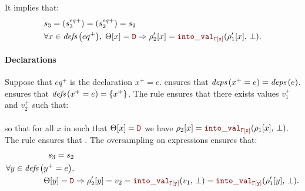 \begin{skippableproof}
    It implies that:
    \begin{align*}
         & s_3 = (s_3^{eq+}) = (s_2^{eq+}) = s_2                                                                            \\
         & \forall x \in \defs{eq^+}, \; \Theta[x] = \dType \Rightarrow \rho'_2[x] = \intoVal{\tyCtx[x]}{\rho'_1[x]}{\bot}.
    \end{align*}

    \paragraph{Declarations}
    Suppose that $eq^+$ is the declaration $x^+ = e$.
     ensures that
    ${\textit{deps}\left(x^+ = e\right)} = {\textit{deps}\left(e\right)}$.
     ensures that
    ${\textit{defs}\left(x^+ = e\right)} = \{x^+\}$.
    The rule  ensures that there exists
    values $v_1^+$ and $v_2^+$ such that:
    \\\noindent{}\\\noindent
    so that for all $x$ in  such that $\Theta[x] = \dType$ we have $\rho_2[x] =
        \intoVal{\tyCtx[x]}{\rho_1[x]}{\bot}$.
    The rule  ensures that
    .
    The oversampling  on expressions
    ensures that:
    \begin{align*}
        s_3 = s_2                     &                          \\
        \forall y \in \defs{y^+ = e}, &                          \\
        \Theta[y] = \dType            & \Rightarrow \rho'_2[y] =
        v_2 = \intoVal{\tyCtx[y]}{v_1}{\bot} = \intoVal{\tyCtx[y]}{\rho'_1[y]}{\bot}.
    \end{align*}


\end{skippableproof}
